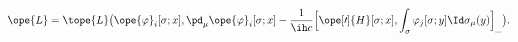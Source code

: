 \begin{equation}	\label{12.41}
\ope{L}
=
\tope{L}\bigl(
	\ope{\varphi}_i[\sigma;x],
	\pd_\mu\ope{\varphi}_i[\sigma;x]
	- \frac{1}{\ih c} \Bigl[\ope[\prime]{H}[\sigma;x] ,
	\int_\sigma \varphi_j[\sigma;y] \Id\sigma_\mu(y) \Bigr]_{\_}
	 \bigr) .
	\end{equation}


